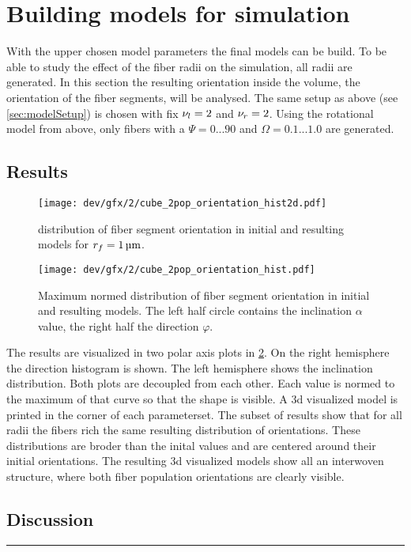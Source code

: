 \section{Building models for simulation}
% 
With the upper chosen model parameters the final models can be build.
To be able to study the effect of the fiber radii on the simulation, all radii are generated.
In this section the resulting orientation inside the volume, \ie{} the orientation of the fiber segments, will be analysed.
The same setup as above (see \cref{sec:modelSetup}) is chosen with fix $\textnormal{$\nu_{l}$}=\SI{2}{}$ and $\textnormal{$\nu_{r}$} = \SI{2}{}$.
Using the rotational model from above, only fibers with a $\Psi =  0...90$ and $\Omega = 0.1...1.0$ are generated.
% 
\subsection{Results}
% 
\begin{figure}[!t]
\centering
\texttt{[image: dev/gfx/2/cube\_2pop\_orientation\_hist2d.pdf]}
\caption[Model orientation histograms]{distribution of fiber segment orientation in initial and resulting models for $\fiberRadius = \SI{1}{\micro\meter}$. }
\label{fig:modelOrientation}
\end{figure}
% 
\begin{figure}[p]
\centering
\texttt{[image: dev/gfx/2/cube\_2pop\_orientation\_hist.pdf]}
\caption[Model orientation histograms]{Maximum normed distribution of fiber segment orientation in initial and resulting models. The left half circle contains the inclination $\alpha$ value, the right half the direction $\varphi$. }
\label{fig:modelOrientationHist1d}
\end{figure}
% 
The results are visualized in two polar axis plots in \cref{fig:modelOrientationHist1d}. On the right hemisphere the direction histogram is shown.
The left hemisphere shows the inclination distribution.
Both plots are decoupled from each other. 
Each value is normed to the maximum of that curve so that the shape is visible.
A 3d visualized model is printed in the corner of each parameterset.
% 
The subset of results show that for all radii the fibers rich the same resulting distribution of orientations. 
These distributions are broder than the inital values and are centered around their initial orientations.
The resulting 3d visualized models show all an interwoven structure, where both fiber population orientations are clearly visible. 
%  
\subsection{Discussion}
% 
\vspace{5pt}
\hrule
\vspace{6pt}
% 
